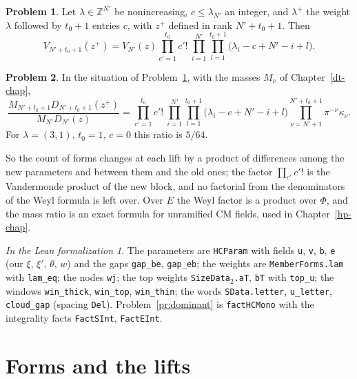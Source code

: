 \documentclass[reqno]{amsart}
\newcounter{chap}
\theoremstyle{definition}
\newtheorem{problem}{Problem}[section]
\theoremstyle{plain}
\theoremstyle{remark}
\newtheorem*{leanremark}{In the Lean formalization}
\newcommand{\Z}{\mathbb Z}
\newcommand{\tl}[1]{\texttt{#1}}
\begin{document}
\begin{problem}\label{pr:add-block}
Let \(\lambda\in\Z^{N'}\) be nonincreasing, \(c\le\lambda_{N'}\) an integer, and \(\lambda^+\) the weight \(\lambda\) followed by \(t_0+1\) entries \(c\), with \(z^+\) defined in rank \(N'+t_0+1\).  Then
\[
 V_{N'+t_0+1}(z^+)=V_{N'}(z)\prod_{c'=1}^{t_0}c'!\ \prod_{i=1}^{N'}\prod_{l=1}^{t_0+1}\bigl(\lambda_i-c+N'-i+l\bigr).
\]
\end{problem}

\begin{problem}\label{pr:count-block}
In the situation of Problem~\ref{pr:add-block}, with the masses \(M_\nu\) of Chapter~\ref{dt-chap},
\[
 \frac{M_{N'+t_0+1}D_{N'+t_0+1}(z^+)}{M_{N'}D_{N'}(z)}
 =\prod_{c'=1}^{t_0}c'!\ \prod_{i=1}^{N'}\prod_{l=1}^{t_0+1}\bigl(\lambda_i-c+N'-i+l\bigr)\prod_{\nu=N'+1}^{N'+t_0+1}\pi^{-\nu}\kappa_\nu .
\]
For \(\lambda=(3,1)\), \(t_0=1\), \(c=0\) this ratio is \(5/64\).
\end{problem}

So the count of forms changes at each lift by a product of differences among the new parameters and between them and the old ones; the factor \(\prod_{c'}c'!\) is the Vandermonde product of the new block, and no factorial from the denominators of the Weyl formula is left over.  Over \(E\) the Weyl factor is a product over \(\Phi\), and the mass ratio is an exact formula for unramified CM fields, used in Chapter~\ref{hp-chap}.

\begin{leanremark}
\raggedright The parameters are \tl{HCParam} with fields \tl{u}, \tl{v}, \tl{b}, \tl{e} (our \(\xi\), \(\xi'\), \(\theta\), \(w\)) and the gaps \tl{gap\_be}, \tl{gap\_eb}; the weights are \tl{MemberForms.lam} with \tl{lam\_eq}; the nodes \tl{wj}; the top weights \tl{SizeData\(_2\).aT}, \tl{bT} with \tl{top\_u}; the windows \tl{win\_thick}, \tl{win\_top}, \tl{win\_thin}; the words \tl{SData.letter}, \tl{u\_letter}, \tl{cloud\_gap} (spacing \tl{Del}).  Problem~\ref{pr:dominant} is \tl{factHCMono} with the integrality facts \tl{FactSInt}, \tl{FactEInt}.
\end{leanremark}

\section{Forms and the lifts}\label{sec:lifts}
\end{document}
